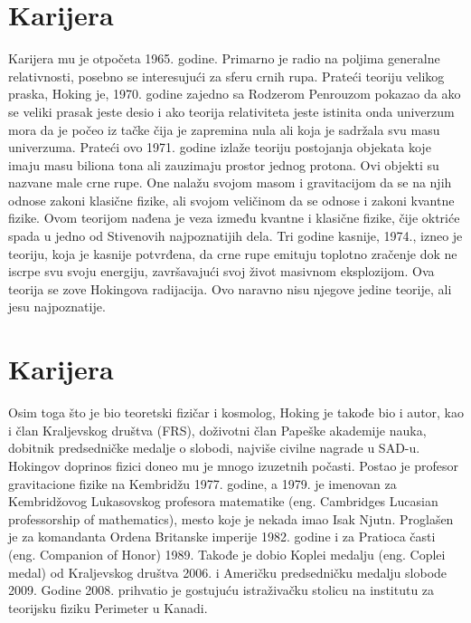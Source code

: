 \documentclass[a4paper, 12pt]{article}
\begin{document}
{\section{Karijera}
Karijera mu je otpočeta 1965. godine. Primarno je radio na poljima generalne relativnosti, posebno se interesujući za sferu crnih rupa. Prateći teoriju velikog praska, Hoking je, 1970. godine zajedno sa Rodzerom Penrouzom pokazao da ako se veliki prasak jeste desio i ako teorija relativiteta jeste istinita onda univerzum mora da je počeo iz tačke čija je zapremina nula ali koja je sadržala svu masu univerzuma. Prateći ovo 1971. godine izlaže teoriju postojanja objekata koje imaju masu biliona tona ali zauzimaju prostor jednog protona. Ovi objekti su nazvane male crne rupe. One nalažu svojom masom i gravitacijom da se na njih odnose zakoni klasične fizike, ali svojom veličinom da se odnose i zakoni kvantne fizike. Ovom teorijom nađena je veza između kvantne i klasične fizike, čije oktriće spada u jedno od Stivenovih najpoznatijih dela. Tri godine kasnije, 1974., izneo je teoriju, koja je kasnije potvrđena, da crne rupe emituju toplotno zračenje dok ne iscrpe svu svoju energiju, završavajući svoj život masivnom eksplozijom. Ova teorija se zove Hokingova radijacija. Ovo naravno nisu njegove jedine teorije, ali jesu najpoznatije.



\section{Karijera}
Osim toga što je bio teoretski fizičar i kosmolog, Hoking je takođe bio i autor, kao i član Kraljevskog društva (FRS), doživotni član Papeške akademije nauka, dobitnik predsedničke medalje o slobodi, najviše civilne nagrade u SAD-u. Hokingov doprinos fizici doneo mu je mnogo izuzetnih počasti. Postao je profesor gravitacione fizike na Kembridžu 1977. godine, a 1979. je imenovan za Kembridžovog Lukasovskog profesora matematike (eng. Cambridges Lucasian professorship of mathematics), mesto koje je nekada imao Isak Njutn. Proglašen je za komandanta Ordena Britanske imperije 1982. godine i za Pratioca časti (eng. Companion of Honor) 1989. Takođe je dobio Koplei medalju (eng. Coplei medal) od Kraljevskog društva 2006. i Američku predsedničku medalju slobode 2009. Godine 2008. prihvatio je gostujuću istraživačku stolicu na institutu za teorijsku fiziku Perimeter u Kanadi.

}
\end{document}

